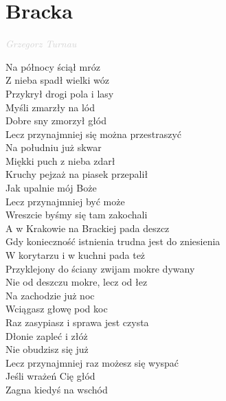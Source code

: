 \documentclass[a5paper, 10pt]{book}
\begin{document}
\section{Bracka}\textcolor{lightgray}{\textit{Grzegorz Turnau}}\\
\begin{minipage}[t]{0.8\textwidth}
  Na północy ściął mróz\\
  Z nieba spadł wielki wóz\\
  Przykrył drogi pola i lasy\\
  Myśli zmarzły na lód\\
  Dobre sny zmorzył głód\\
  Lecz przynajmniej się można przestraszyć\vspace*{2mm}\\
  Na południu już skwar\\
  Miękki puch z nieba zdarł\\
  Kruchy pejzaż na piasek przepalił\\
  Jak upalnie mój Boże\\
  Lecz przynajmniej być może\\
  Wreszcie byśmy się tam zakochali\vspace*{2mm}\\
  \hspace*{5mm}A w Krakowie na Brackiej pada deszcz\\
  \hspace*{5mm}Gdy konieczność istnienia trudna jest do zniesienia\\
  \hspace*{5mm}W korytarzu i w kuchni pada też\\
  \hspace*{5mm}Przyklejony do ściany zwijam mokre dywany\\
  \hspace*{5mm}Nie od deszczu mokre, lecz od łez\vspace*{2mm}\\
  Na zachodzie już noc\\
  Wciągasz głowę pod koc\\
  Raz zasypiasz i sprawa jest czysta\\
  Dłonie zapleć i złóż\\
  Nie obudzisz się już\\
  Lecz przynajmniej raz możesz się wyspać\vspace*{2mm}\\
  Jeśli wrażeń Cię głód\\
  Zagna kiedyś na wschód\\

\end{minipage}
\end{document}
